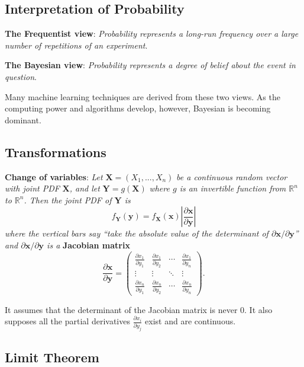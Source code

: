 \documentclass{progartcn}
\begin{document}
	\subsection{Interpretation of Probability}

		\textbf{The Frequentist view}: \textit{Probability represents a long-run frequency over a large number of repetitions of an experiment}. 

		\textbf{The Bayesian view}: \textit{Probability represents a degree of belief about the event in question}.

		Many machine learning techniques are derived from these two views. As the computing power and algorithms develop, however, Bayesian is becoming dominant.\\

	\subsection{Transformations}

		\textbf{Change of variables}: \textit{Let }$\bm{X}=(X_1,...,X_n)$\textit{ be a continuous random vector with joint PDF }$\bm{X}$\textit{, and let }$\bm{Y}=g(\bm{X})$\textit{ where $g$ is an invertible function from $\mathbb{R}^n$ to $\mathbb{R}^n$. Then the joint PDF of $\bm{Y}$ is}
		\[f_{\bm{Y}}(\bm{y})=f_{\bm{X}}(\bm{x})\left\vert\frac{\partial\bm{x}}{\partial\bm{y}}\right\vert
		\label{eq_trans_variables}\]
		\textit{where the vertical bars say ``take the absolute value of the determinant of $\partial\bm{x}\slash \partial \bm{y}$'' and $\partial\bm{x}\slash \partial \bm{y}$ is a }\textbf{Jacobian matrix}
		\[
		\frac{\partial\bm{x}}{\partial\bm{y}} = 
		\begin{pmatrix}
		\frac{\partial x_1}{\partial y_1} & \frac{\partial x_1}{\partial y_2} & \cdots & \frac{\partial x_1}{\partial y_n} \\
		\vdots  & \vdots  & \ddots & \vdots  \\
		\frac{\partial x_n}{\partial y_1} & \frac{\partial x_n}{\partial y_2}& \cdots & \frac{\partial x_n}{\partial y_n}
		\end{pmatrix}.\]

		It assumes that the determinant of the Jacobian matrix is never 0. It also supposes all the partial derivatives $\frac{\partial x_i}{\partial y_j}$ exist and are continuous.\\

	\subsection{Limit Theorem}
\end{document}
